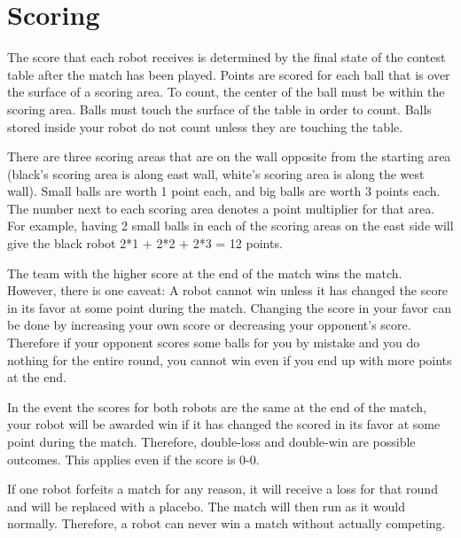 \section{Scoring}

The score that each robot receives is determined by the final state of
the contest table after the match has been played.  Points are scored
for each ball that is over the surface of a scoring area. To count,
the center of the ball must be within the scoring area. Balls must
touch the surface of the table in order to count. Balls stored inside
your robot do not count unless they are touching the table.

There are three scoring areas that are on the wall opposite from the
starting area (black's scoring area is along east wall, white's
scoring area is along the west wall). Small balls are worth 1 point
each, and big balls are worth 3 points each.  The number next to each
scoring area denotes a point multiplier for that area.  For example,
having 2 small balls in each of the scoring areas on the east side
will give the black robot 2*1 + 2*2 + 2*3 = 12 points.

The team with the higher score at the end of the match wins the
match. However, there is one caveat: A robot cannot win unless it has
changed the score in its favor at some point during the
match. Changing the score in your favor can be done by increasing your
own score or decreasing your opponent's score. Therefore if your
opponent scores some balls for you by mistake and you do nothing for
the entire round, you cannot win even if you end up with more points
at the end.

In the event the scores for both robots are the same at the end of the
match, your robot will be awarded win if it has changed the scored in
its favor at some point during the match. Therefore, double-loss and
double-win are possible outcomes. This applies even if the score is
0-0.

If one robot forfeits a match for any reason, it will receive a loss
for that round and will be replaced with a placebo. The match will
then run as it would normally. Therefore, a robot can never win a
match without actually competing.
